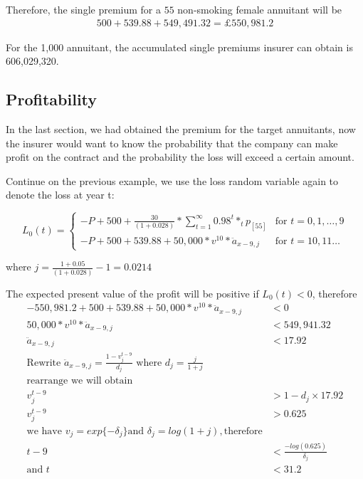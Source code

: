 \documentclass{report}
\begin{document}
Therefore, the single premium for a $55$ non-smoking female annuitant will be 
\begin{align}
500 + 539.88 +549,491.32= \pounds550,981.2 \nonumber
\end{align}

For the 1,000 annuitant, the accumulated single premiums insurer can obtain is 606,029,320.

\subsection{Profitability}

In the last section, we had obtained the premium for the target annuitants, now the insurer would want to know the probability that the company can make profit on the contract and the probability the loss will exceed a certain amount.

Continue on the previous example, we use the loss random variable again to denote the loss at year t:

\[
 L_0(t) =
  \begin{cases}
   -P + 500 + \frac{30}{(1+0.028)} * \sum_{t=1}^{\infty} 0.98^t * _tp_{[55]} & \text{for } t= 0,1, \dots, 9 \\
   -P +500 +539.88 +  50,000*v^{10}*\ddot{a}_{x-9,j}  & \text{for }  t = 10, 11\dots
  \end{cases}
\]

where $j= \frac{1+0.05}{(1+0.028)}-1=0.0214$

The expected present value of the profit will be positive if $L_0(t) < 0$, therefore
 \begin{align*}
   -550,981.2 +500+ 539.88 + 50,000*v^{10}*\ddot{a}_{x-9,j}  &< 0 \\
   50,000*v^{10}*\ddot{a}_{x-9,j} &< 549,941.32 \\
   \ddot{a}_{x-9,j} &< 17.92 \\
\text{Rewrite } \ddot{a}_{x-9,j} = \frac{1-v^{t-9}_j}{d_j} \text{ where } d_j =\frac{j}{1+j}\\
\text{rearrange we will obtain}\\
v^{t-9}_j &> 1-d_j\times 17.92\\
v^{t-9}_j &> 0.625\\
\text{we have } v_j = exp\{-\delta_j\} \text{and } \delta_j =log(1+j),\text{therefore}\\
t-9&< \frac{-log(0.625)}{\delta_j}\\
\text{and } t &< 31.2
\end{align*}
\end{document}
